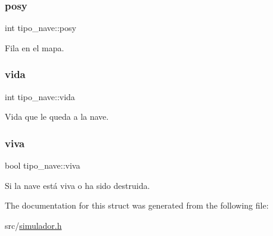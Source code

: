 \subsubsection{\texorpdfstring{posy}{posy}}
{\footnotesize\ttfamily int tipo\+\_\+nave\+::posy}



Fila en el mapa. 

\mbox{\label{structtipo__nave_a319f01d0152cadf2b976ef51c93ff7ae}} 
\subsubsection{\texorpdfstring{vida}{vida}}
{\footnotesize\ttfamily int tipo\+\_\+nave\+::vida}



Vida que le queda a la nave. 

\mbox{\label{structtipo__nave_a5fd530b54ff7694b07d41d3a168b800c}} 
\subsubsection{\texorpdfstring{viva}{viva}}
{\footnotesize\ttfamily bool tipo\+\_\+nave\+::viva}



Si la nave está viva o ha sido destruida. 



The documentation for this struct was generated from the following file\+:\begin{DoxyCompactItemize}
\item 
src/\hyperlink{simulador_8h}{simulador.\+h}\end{DoxyCompactItemize}
